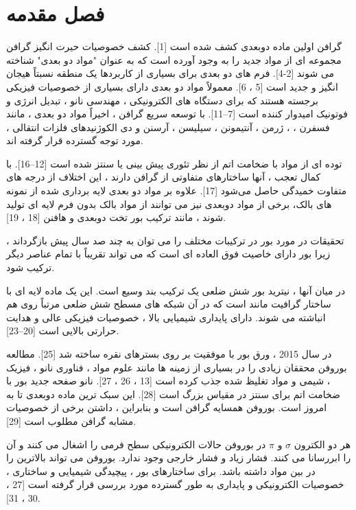 ﻿\chapter{فصل مقدمه} 
\newpage
گرافن اولین ماده دوبعدی کشف شده است [1]. کشف خصوصیات حیرت انگیز گرافن مجموعه ای از مواد جدید را به وجود آورده است که به عنوان "مواد دو بعدی" شناخته می شوند [2-4]. فرم های دو بعدی برای بسیاری از کاربردها یک منطقه نسبتاً هیجان انگیز و جدید است [5 ، 6]. معمولاً مواد دو بعدی دارای بسیاری از خصوصیات فیزیکی برجسته هستند که برای دستگاه های الکترونیکی ، مهندسی نانو ، تبدیل انرژی و فوتونیک امیدوار کننده است [7–11]. با توسعه سریع گرافن ، اخیراً مواد دو بعدی ، مانند فسفرن ، 
 ، ژرمن ، آنتیمونن ، سیلیسن ، آرسنن و دی الكوژنیدهای فلزات انتقالی ، مورد توجه گسترده قرار گرفته اند.

توده ای از مواد با ضخامت اتم از نظر تئوری پیش بینی یا سنتز شده است [12–16]. با کمال تعجب ، آنها ساختارهای متفاوتی از گرافن دارند ، این اختلاف از درجه های متفاوت خمیدگی حاصل می‌شود [17]. علاوه بر مواد دو بعدی لایه برداری شده از نمونه های بالک، برخی از مواد دوبعدی نیز می توانند از مواد بالک بدون فرم لایه ای تولید شوند ، مانند ترکیب بور تخت دوبعدی   و هافنن [18 ، 19].

تحقیقات در مورد بور در ترکیبات مختلف را می توان به چند صد سال پیش بازگرداند ، زیرا بور دارای خاصیت فوق العاده ای است که می تواند تقریباً با تمام عناصر دیگر ترکیب شود.

در میان آنها ، نیترید بور شش ضلعی  یک ترکیب بند وسیع  است. این یک ماده لایه ای با ساختار گرافیت مانند است که در آن شبکه های مسطح شش ضلعی  مرتباً روی هم انباشته می شوند.  دارای پایداری شیمیایی بالا ، خصوصیات فیزیکی عالی و هدایت حرارتی بالایی است [20–23].

در سال 2015 ، ورق بور  با موفقیت بر روی بسترهای نقره   ساخته شد [25]. مطالعه بوروفن محققان زیادی را در بسیاری از زمینه ها مانند علوم مواد ، فناوری نانو ، فیزیک ، شیمی و مواد تغلیظ شده جذب کرده است [13 ، 26 ، 27].  نانو صفحه جدید بور با ضخامت اتم برای سنتز در مقیاس بزرگ است [28]. این سبک ترین ماده دوبعدی تا به امروز است. بوروفن همسایه گرافن است و بنابراین ، داشتن برخی از خصوصیات مشابه گرافن مطلوب است [29].

هر دو الکترون $\sigma$ و $\pi$ در بوروفن حالات الکترونیکی سطح فرمی را اشغال می کنند و آن را ابررسانا می کنند. فشار زیاد و فشار خارجی وجود ندارد. بوروفن می تواند بالاترین  را در بین مواد  داشته باشد. برای ساختارهای بور ، پیچیدگی شیمیایی و ساختاری ، خصوصیات الکترونیکی و پایداری به طور گسترده مورد بررسی قرار گرفته است [27 ، 30 ، 31].

